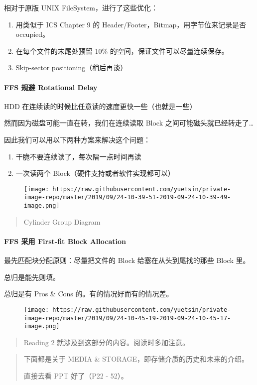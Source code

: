 \documentclass[
]{article}
\begin{document}
相对于原版 UNIX FileSystem，进行了这些优化：

\begin{enumerate}
\def\labelenumi{\arabic{enumi}.}
\item
  用类似于 ICS Chapter 9 的 Header/Footer，Bitmap，用字节位来记录是否
  occupied。
\item
  在每个文件的末尾处预留 10\% 的空间，保证文件可以尽量连续保存。
\item
  Skip-sector positioning（稍后再谈）
\end{enumerate}

\hypertarget{header-n174}{%
\paragraph{FFS 规避 Rotational Delay}\label{header-n174}}

HDD 在连续读的时候比任意读的速度更快一些（也就是一些）

然而因为磁盘可能一直在转，我们在连续读取 Block
之间可能磁头就已经转走了\ldots{}

因此我们可以用以下两种方案来解决这个问题：

\begin{enumerate}
\def\labelenumi{\arabic{enumi}.}
\item
  干脆不要连续读了，每次隔一点时间再读
\item
  一次读两个 Block（硬件支持或者软件实现都可以）
\end{enumerate}

\begin{figure}
\centering
\texttt{[image: https://raw.githubusercontent.com/yuetsin/private-image-repo/master/2019/09/24-10-39-51-2019-09-24-10-39-49-image.png]}
\caption{}
\end{figure}

\begin{quote}
Cylinder Group Diagram
\end{quote}

\hypertarget{header-n186}{%
\paragraph{FFS 采用 First-fit Block Allocation}\label{header-n186}}

最先匹配块分配原则：尽量把文件的 Block 给塞在从头到尾找的那些 Block 里。

总归是能先则填。

总归是有 Pros \& Cons 的。有的情况好而有的情况差。

\begin{figure}
\centering
\texttt{[image: https://raw.githubusercontent.com/yuetsin/private-image-repo/master/2019/09/24-10-45-19-2019-09-24-10-45-17-image.png]}
\caption{}
\end{figure}

\begin{quote}
Reading 2 就涉及到这部分的内容。阅读时多加注意。
\end{quote}

\begin{quote}
下面都是关于 MEDIA \& STORAGE，即存储介质的历史和未来的介绍。

直接去看 PPT 好了（P22 - 52）。
\end{quote}
\end{document}

